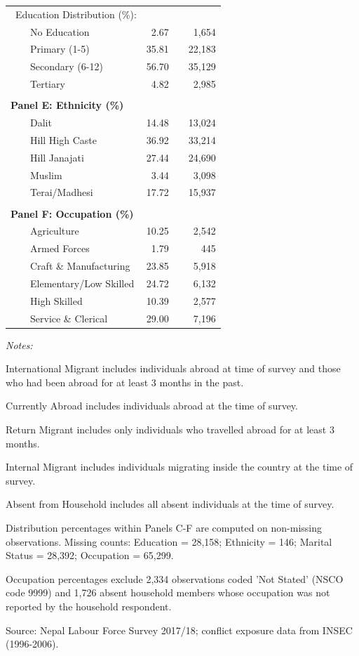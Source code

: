 \begin{table}[!h]
\begin{threeparttable}
\begin{tabular}[t]{lrrr}
 Education Distribution (\%): &  &  & \\
    No Education & 2.67 &  & 1,654\\
    Primary (1-5) & 35.81 &  & 22,183\\
    Secondary (6-12) & 56.70 &  & 35,129\\
\addlinespace
    Tertiary & 4.82 &  & 2,985\\
 &  &  & \\
\textbf{Panel E: Ethnicity (\%)} & \textbf{} & \textbf{} & \textbf{}\\
    Dalit & 14.48 &  & 13,024\\
    Hill High Caste & 36.92 &  & 33,214\\
\addlinespace
    Hill Janajati & 27.44 &  & 24,690\\
    Muslim & 3.44 &  & 3,098\\
    Terai/Madhesi & 17.72 &  & 15,937\\
 &  &  & \\
\textbf{Panel F: Occupation (\%)} & \textbf{} & \textbf{} & \textbf{}\\
\addlinespace
    Agriculture & 10.25 &  & 2,542\\
    Armed Forces & 1.79 &  & 445\\
    Craft \& Manufacturing & 23.85 &  & 5,918\\
    Elementary/Low Skilled & 24.72 &  & 6,132\\
    High Skilled & 10.39 &  & 2,577\\
\addlinespace
    Service \& Clerical & 29.00 &  & 7,196\\
\bottomrule
\end{tabular}
\begin{tablenotes}
\item \textit{Notes:} 
\item International Migrant includes individuals abroad at time of survey and those who had been abroad for at least 3 months in the past.
\item Currently Abroad includes individuals abroad at the time of survey.
\item Return Migrant includes only individuals who travelled abroad for at least 3 months.
\item Internal Migrant includes individuals migrating inside the country at the time of survey.
\item Absent from Household includes all absent individuals at the time of survey.
\item Distribution percentages within Panels C-F are computed on non-missing observations. Missing counts: Education = 28,158; Ethnicity = 146; Marital Status = 28,392; Occupation = 65,299.
\item Occupation percentages exclude 2,334 observations coded 'Not Stated' (NSCO code 9999) and 1,726 absent household members whose occupation was not reported by the household respondent.
\item Source: Nepal Labour Force Survey 2017/18; conflict exposure data from INSEC (1996-2006).
\end{tablenotes}
\end{threeparttable}
\end{table}
